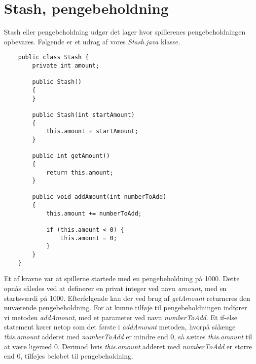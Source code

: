 \section{Stash, pengebeholdning}
\noindent Stash eller pengebeholdning udgør det lager hvor spillerenes pengebeholdningen opbevares. 
Følgende er et udrag af vores \textit{Stash.java} klasse.\\
\begin{lstlisting}
    public class Stash {
        private int amount;
    
        public Stash()
        {
        }
    
        public Stash(int startAmount)
        {
            this.amount = startAmount;
        }
    
        public int getAmount()
        {
            return this.amount;
        }
    
        public void addAmount(int numberToAdd)
        {
            this.amount += numberToAdd;
    
            if (this.amount < 0) {
                this.amount = 0;
            }
        }
    }
\end{lstlisting}
\vspace{2ex}

\noindent Et af kravne var at spillerne startede med en pengebeholdning på 1000.
Dette opnås således ved at definerer en privat integer ved navn \textit{amount}, med en startsværdi på 1000.
Efterfølgende kan der ved brug af \textit{getAmount} returneres den nuværende pengebeholdning.
For at kunne tilføje til pengebeholdningen indfører vi metoden \textit{addAmount}, med et parameter ved navn \textit{numberToAdd}.
Et if-else statement kører netop som det første i \textit{addAmount} metoden, hvorpå sålænge \textit{this.amount} adderet med \textit{numberToAdd} er mindre end 0, så sættes \textit{this.amount} til at være ligemed 0.
Derimod hvis \textit{this.amount} adderet med \textit{numberToAdd} er større end 0, tilføjes beløbet til pengebeholdning.\\

